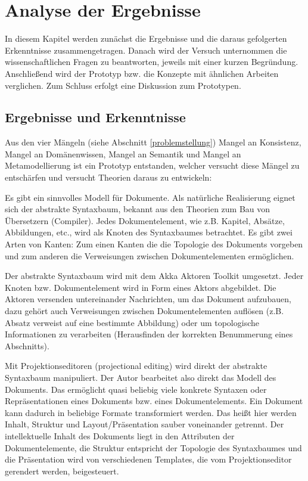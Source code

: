  
\chapter{Analyse der Ergebnisse}\label{}
 
In diesem Kapitel werden zunächst die Ergebnisse und die daraus gefolgerten Erkenntnisse zusammengetragen. Danach wird der Versuch unternommen die wissenschaftlichen Fragen zu beantworten, jeweils mit einer kurzen Begründung. Anschließend wird der Prototyp bzw. die Konzepte mit ähnlichen Arbeiten verglichen. Zum Schluss erfolgt eine Diskussion zum Prototypen.

 
\section{Ergebnisse und Erkenntnisse}\label{}
 
Aus den vier Mängeln (siehe Abschnitt \ref{problemstellung}) Mangel an Konsistenz, Mangel an Domänenwissen, Mangel an Semantik und Mangel an Metamodellierung ist ein Prototyp entstanden, welcher versucht diese Mängel zu entschärfen und versucht Theorien daraus zu entwickeln:

 
Es gibt ein sinnvolles Modell für Dokumente. Als natürliche Realisierung eignet sich der abstrakte Syntaxbaum, bekannt aus den Theorien zum Bau von Übersetzern (Compiler). Jedes Dokumentelement, wie z.B. Kapitel, Absätze, Abbildungen, etc., wird als Knoten des Syntaxbaumes betrachtet. Es gibt zwei Arten von Kanten: Zum einen Kanten die die Topologie des Dokuments vorgeben und zum anderen die Verweisungen zwischen Dokumentelementen ermöglichen.

 
Der abstrakte Syntaxbaum wird mit dem Akka Aktoren Toolkit umgesetzt. Jeder Knoten bzw. Dokumentelement wird in Form eines Aktors abgebildet. Die Aktoren versenden untereinander Nachrichten, um das Dokument aufzubauen, dazu gehört auch Verweisungen zwischen Dokumentelementen auflösen (z.B. Absatz verweist auf eine bestimmte Abbildung) oder um topologische Informationen zu verarbeiten (Herausfinden der korrekten Benummerung eines Abschnitts).

 
Mit Projektionseditoren (projectional editing) wird direkt der abstrakte Syntaxbaum manipuliert. Der Autor bearbeitet also direkt das Modell des Dokuments. Das ermöglicht quasi beliebig viele konkrete Syntaxen oder Repräsentationen eines Dokuments bzw. eines Dokumentelements. Ein Dokument kann dadurch in beliebige Formate transformiert werden. Das heißt hier werden Inhalt, Struktur und Layout/Präsentation sauber voneinander getrennt. Der intellektuelle Inhalt des Dokuments liegt in den Attributen der Dokumentelemente, die Struktur entspricht der Topologie des Syntaxbaumes und die Präsentation wird von verschiedenen Templates, die vom Projektionseditor gerendert werden, beigesteuert.

